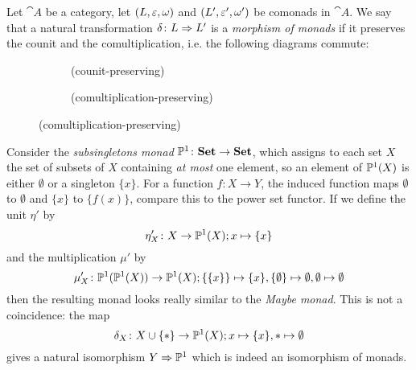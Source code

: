 \begin{definition}
    Let $\cat{A}$ be a category, let $(L,\eps,\omega)$ and $(L',\eps',\omega')$ be comonads in $\cat{A}$.
    We say that a natural transformation $\nat[\delta]{L}{L'}$ is a \textit{morphism of monads} if it preserves
    the counit and the comultiplication, i.e. the following diagrams commute:
    \begin{figure}[H]
    \centering
    \begin{subfigure}{0.4\textwidth}
    \centering
    \caption*{(counit-preserving)}
    \end{subfigure}
    \hspace{2em}
    \begin{subfigure}{0.4\textwidth}
    \centering
    \caption*{(comultiplication-preserving)}
    \end{subfigure}
    \end{figure} 
\end{definition}
\begin{example}
    Consider the \textit{subsingletons monad} $\P^1 \colon \cat{Set} \to \cat{Set}$, which
    assigns to each set $X$ the set of subsets of $X$ containing \textit{at most} one element, so
    an element of $\P^1(X)$ is either $\emptyset$ or a singleton $\{x\}$. For a function 
    $f \colon X \to Y$, the induced function maps $\emptyset$ to $\emptyset$ and $\{x\}$ to 
    $\{f(x)\}$, compare this to the power set functor. If we define the unit $\eta'$ by
    \[
        \eta'_X \colon X \to \P^1(X); x \mapsto \{x\}
    \]
    and the multiplication $\mu'$ by 
    \[
        \mu'_X \colon \P^1(\P^1(X)) \to \P^1(X); \{\{x\}\} \mapsto \{x\},
        \{\emptyset\} \mapsto \emptyset, \emptyset \mapsto \emptyset
    \]
    then the resulting monad looks really similar to the \textit{Maybe monad}. 
    This is not a coincidence: the map
    \[
        \delta_X \colon X \cup \pt \to \P^1(X); x \mapsto \{x\}, \ast \mapsto \emptyset
    \]
    gives a natural isomorphism $Y \Rightarrow \P^1$ which is indeed an isomorphism of monads.


\end{example}
